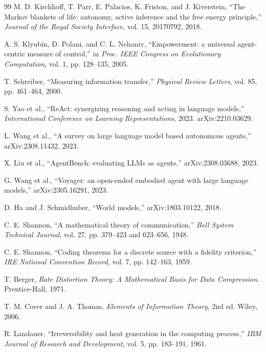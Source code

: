 \documentclass[10pt,a4paper,twocolumn,aps,prl]{revtex4-2}
\begin{document}
\begin{thebibliography}{99}
M. D. Kirchhoff, T. Parr, E. Palacios, K. Friston, and J. Kiverstein, ``The Markov blankets of life: autonomy, active inference and the free energy principle,'' \emph{Journal of the Royal Society Interface}, vol. 15, 20170792, 2018.

A. S. Klyubin, D. Polani, and C. L. Nehaniv, ``Empowerment: a universal agent-centric measure of control,'' in \emph{Proc. IEEE Congress on Evolutionary Computation}, vol. 1, pp. 128--135, 2005.

T. Schreiber, ``Measuring information transfer,'' \emph{Physical Review Letters}, vol. 85, pp. 461--464, 2000.

S. Yao et al., ``ReAct: synergizing reasoning and acting in language models,'' \emph{International Conference on Learning Representations}, 2023. arXiv:2210.03629.

L. Wang et al., ``A survey on large language model based autonomous agents,'' arXiv:2308.11432, 2023.

X. Liu et al., ``AgentBench: evaluating LLMs as agents,'' arXiv:2308.03688, 2023.

G. Wang et al., ``Voyager: an open-ended embodied agent with large language models,'' arXiv:2305.16291, 2023.

D. Ha and J. Schmidhuber, ``World models,'' arXiv:1803.10122, 2018.

C. E. Shannon, ``A mathematical theory of communication,'' \emph{Bell System Technical Journal}, vol. 27, pp. 379--423 and 623--656, 1948.

C. E. Shannon, ``Coding theorems for a discrete source with a fidelity criterion,'' \emph{IRE National Convention Record}, vol. 7, pp. 142--163, 1959.

T. Berger, \emph{Rate Distortion Theory: A Mathematical Basis for Data Compression}. Prentice-Hall, 1971.

T. M. Cover and J. A. Thomas, \emph{Elements of Information Theory}, 2nd ed. Wiley, 2006.

R. Landauer, ``Irreversibility and heat generation in the computing process,'' \emph{IBM Journal of Research and Development}, vol. 5, pp. 183--191, 1961.


\end{thebibliography}
\end{document}
